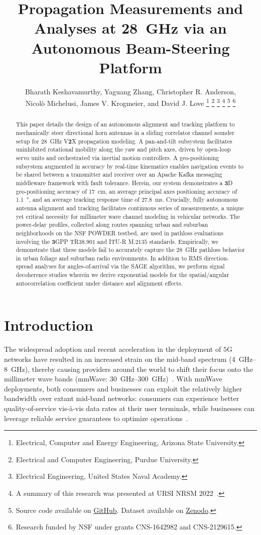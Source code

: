 \documentclass[10pt, twocolumn]{IEEEtran}
\title{Propagation Measurements and Analyses at \SI{28}{\giga\hertz} via an Autonomous Beam-Steering Platform}
\author{Bharath Keshavamurthy\IEEEauthorrefmark{1}, Yaguang Zhang\IEEEauthorrefmark{2}, Christopher R. Anderson\IEEEauthorrefmark{3},\\Nicol\`{o} Michelusi\IEEEauthorrefmark{1}, James V. Krogmeier\IEEEauthorrefmark{2}, and David J. Love\IEEEauthorrefmark{2}
\thanks{\IEEEauthorrefmark{1}Electrical, Computer and Energy Engineering, Arizona State University.}
\thanks{\IEEEauthorrefmark{2}Electrical and Computer Engineering, Purdue University.}
\thanks{\IEEEauthorrefmark{3}Electrical Engineering, United States Naval Academy.}
\thanks{A summary of this research was presented at URSI NRSM 2022~\cite{NRSM}.}
\thanks{Source code available on \href{https://github.com/bharathkeshavamurthy/SPAVE-28G.git}{GitHub}\cite{SPAVE-28G-Software}. Dataset available on \href{https://doi.org/10.5281/zenodo.7178597}{Zenodo}\cite{SPAVE-28G-Dataset}.}
\thanks{Research funded by NSF under grants CNS-1642982 and CNS-2129615.}
\vspace{-12mm}
}
\begin{document}

\maketitle
\thispagestyle{empty}
\pagestyle{empty}
\vspace{-12mm}

\begin{abstract}
This paper details the design of an autonomous alignment and tracking platform to mechanically steer directional horn antennas in a sliding correlator channel sounder setup for \SI{28}{\giga\hertz} V$\bm{2}$X propagation modeling. A pan-and-tilt subsystem facilitates uninhibited rotational mobility along the yaw and pitch axes, driven by open-loop servo units and orchestrated via inertial motion controllers. A geo-positioning subsystem augmented in accuracy by real-time kinematics enables navigation events to be shared between a transmitter and receiver over an Apache Kafka messaging middleware framework with fault tolerance. Herein, our system demonstrates a $\bm{3}$D geo-positioning accuracy of \SI{17}{\centi\meter}, an average principal axes positioning accuracy of \SI{1.1}{\degree}, and an average tracking response time of \SI{27.8}{\milli\second}. Crucially, fully autonomous antenna alignment and tracking facilitates continuous series of measurements, a unique yet critical necessity for millimeter wave channel modeling in vehicular networks. The power-delay profiles, collected along routes spanning urban and suburban neighborhoods on the NSF POWDER testbed, are used in pathloss evaluations involving the $\bm{3}$GPP TR$\bm{38.901}$ and ITU-R M$\bm{.2135}$ standards. Empirically, we demonstrate that these models fail to accurately capture the \SI{28}{\giga\hertz} pathloss behavior in urban foliage and suburban radio environments. In addition to RMS direction-spread analyses for angles-of-arrival via the SAGE algorithm, we perform signal decoherence studies wherein we derive exponential models for the spatial/angular autocorrelation coefficient under distance and alignment effects.
\end{abstract}
\vspace{-10mm}

\section{Introduction}\label{S1}
The widespread adoption and recent acceleration in the deployment of $5$G networks have resulted in an increased strain on the mid-band spectrum (\SIrange{4}{8}{\giga\hertz}), thereby causing providers around the world to shift their focus onto the millimeter wave bands (mmWave: \SIrange{30}{300}{\giga\hertz})~\cite{Commercial}. With mmWave deployments, both consumers and businesses can exploit the relatively higher bandwidth over extant mid-band networks: consumers can experience better quality-of-service vis-\`{a}-vis data rates at their user terminals, while businesses can leverage reliable service guarantees to optimize operations~\cite{Rappaport}. 
\end{document}
